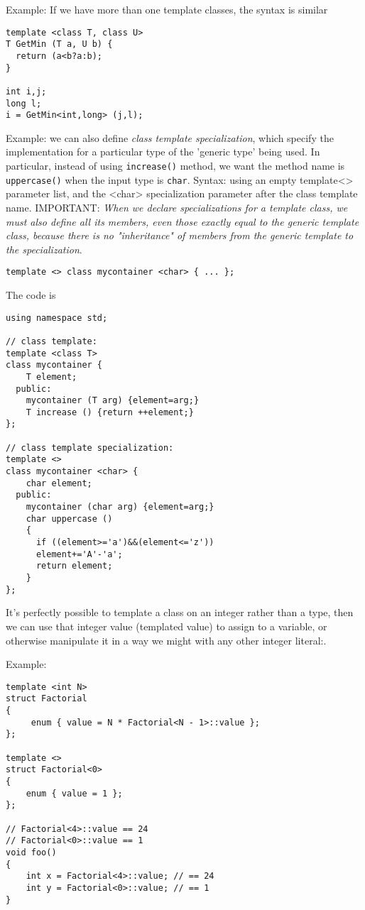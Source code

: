 Example: If we have more than one template classes, the syntax is similar
\begin{lstlisting}
template <class T, class U>
T GetMin (T a, U b) {
  return (a<b?a:b);
}

int i,j;
long l;
i = GetMin<int,long> (j,l);
\end{lstlisting}

Example: we can also define {\it class template specialization}, which specify
the implementation for a particular type of the 'generic type' being used. In
particular, instead of using \verb!increase()! method, we want the method name
is \verb!uppercase()! when the input type is \verb!char!. Syntax: using an empty
template<> parameter list, and the <char> specialization parameter after the
class template name. IMPORTANT: {\it When we declare specializations for a
template class, we must also define all its members, even those exactly equal to the
generic template class, because there is no "inheritance" of members from the
generic template to the specialization}.  
\begin{verbatim}
template <> class mycontainer <char> { ... };
\end{verbatim}
The code is
\begin{lstlisting}
using namespace std;

// class template:
template <class T>
class mycontainer {
    T element;
  public:
    mycontainer (T arg) {element=arg;}
    T increase () {return ++element;}
};

// class template specialization:
template <>
class mycontainer <char> {
    char element;
  public:
    mycontainer (char arg) {element=arg;}
    char uppercase ()
    {
      if ((element>='a')&&(element<='z'))
      element+='A'-'a';
      return element;
    }
};
\end{lstlisting}

It's perfectly possible to template a class on an integer rather than a type,
then we can use that integer value (templated value) to assign to a variable, or
otherwise manipulate it in a way we might with any other integer literal:.

Example:
\begin{lstlisting}
template <int N>
struct Factorial 
{
     enum { value = N * Factorial<N - 1>::value };
};

template <>
struct Factorial<0> 
{
    enum { value = 1 };
};

// Factorial<4>::value == 24
// Factorial<0>::value == 1
void foo()
{
    int x = Factorial<4>::value; // == 24
    int y = Factorial<0>::value; // == 1
}
\end{lstlisting}

